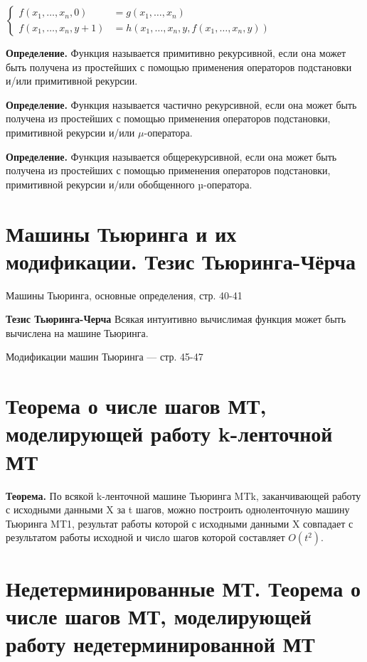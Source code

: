 \documentclass[40pt]{article}
\begin{document}
$\left\{\begin{aligned}
f\left(x_{1}, \ldots, x_{n}, 0\right) &=g\left(x_{1}, \ldots, x_{n}\right) \\
f\left(x_{1}, \ldots, x_{n}, y+1\right) &=h\left(x_{1}, \ldots, x_{n}, y, f\left(x_{1}, \ldots, x_{n}, y\right)\right)
\end{aligned}\right.$

\textbf{Определение.} Функция называется примитивно рекурсивной, если она может быть получена из простейших с помощью
применения операторов подстановки и/или примитивной рекурсии.

\textbf{Определение.} Функция называется частично рекурсивной,
если она может быть получена из простейших с помощью применения операторов подстановки, примитивной рекурсии и/или $\mu$-оператора.

\textbf{Определение.} Функция называется общерекурсивной, если
она может быть получена из простейших с помощью применения
операторов подстановки, примитивной рекурсии и/или обобщенного µ-оператора.

\section{Машины Тьюринга и их модификации. Тезис Тьюринга-Чёрча}

Машины Тьюринга, основные определения, стр. 40-41

\textbf{Тезис Тьюринга-Черча} Всякая интуитивно вычислимая функция может быть вычислена на машине Тьюринга.

Модификации машин Тьюринга --- стр. 45-47

\section{Теорема о числе шагов МТ, моделирующей работу k-ленточной МТ}

\textbf{Теорема.} По всякой k-ленточной машине Тьюринга MTk,
заканчивающей работу с исходными данными X за t шагов, можно
построить одноленточную машину Тьюринга MT1, результат работы которой с исходными данными X совпадает с результатом
работы исходной и число шагов которой составляет $O(t^2)$.

\section{Недетерминированные МТ.  Теорема о числе шагов МТ, моделирующей работу недетерминированной МТ}
\end{document}
